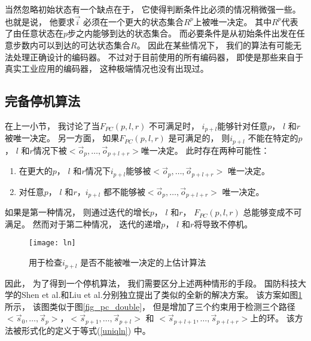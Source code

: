 当然忽略初始状态有一个缺点在于，
它使得判断条件比必须的情况稍微强一些。
也就是说，
他要求$\vec{i}$ 必须在一个更大的状态集合$R^p$上被唯一决定。
其中$R^p$代表了由任意状态在$p$步之内能够到达的状态集合。
而必要条件是从初始条件出发在任意步数内可以到达的可达状态集合$R$。
因此在某些情况下，
我们的算法有可能无法处理正确设计的编码器。
不过对于目前使用的所有编码器，
即使是那些来自于真实工业应用的编码器，
这种极端情况也没有出现过。


\subsection{完备停机算法}\label{subsec_complete}


在上一小节，
我讨论了当$F_{PC}(p,l,r)$ 不可满足时，
$i_{p+l}$能够针对任意$p$， $l$ 和$r$被唯一决定。
另一方面，
如果$F_{PC}(p,l,r)$ 是可满足的，
则$i_{p+l}$ 不能在特定的$p$， $l$ 和$r$情况下被$<\vec{o}_{p},\dots,\vec{o}_{p+l+r}>$唯一决定。
此时存在两种可能性：
\begin{enumerate}
 \item
在更大的$p$， $l$ 和$r$情况下$i_{p+l}$能够被$<\vec{o}_{p},\dots,\vec{o}_{p+l+r}>$ 唯一决定。
 \item
对任意$p$， $l$ 和$r$，$i_{p+l}$ 都不能够被$<\vec{o}_{p},\dots,\vec{o}_{p+l+r}>$ 唯一决定。
\end{enumerate}

如果是第一种情况，
则通过迭代的增长$p$， $l$ 和$r$，
$F_{PC}(p,l,r)$ 总能够变成不可满足。
然而对于第二种情况，
迭代的递增$p$， $l$ 和$r$将导致不停机。

\begin{figure}[t]
\begin{center}
\texttt{[image: ln]}
\end{center}
\caption{用于检查$i_{p+l}$ 是否不能被唯一决定的上估计算法}
  \label{fig_ln_double}
\end{figure}

因此，
为了得到一个停机算法，
我们需要区分上述两种情形的手段。
国防科技大学的Shen et al.和Liu et al.分别独立提出了类似的全新的解决方案。
该方案如图\ref{fig_ln_double}所示，
该图类似于图\ref{fig_pc_double}，
但是增加了三个约束用于检测三个路径$<\vec{s}_{0},\dots,\vec{s}_{p}>$，$<\vec{s}_{p+1},\dots,\vec{s}_{p+l}>$ 和
$<\vec{s}_{p+l+1},\dots,\vec{s}_{p+l+r}>$上的环。
该方法被形式化的定义于等式(\ref{uniqln}) 中。

